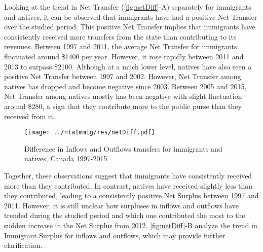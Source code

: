 \vspace{0.7em}\par
Looking at the trend in Net Transfer (\autoref{fig:netDiff}-A) separately for immigrants and natives, it can be observed that immigrants have had a positive Net Transfer over the studied period.
This positive Net Transfer implies that immigrants have consistently received more transfers from the state than contributing to its revenues.
Between 1997 and 2011, the average Net Transfer for immigrants fluctuated around \$\num{1400} per year.
However, it rose rapidly between 2011 and 2013 to surpass \$\num{2100}.
Although at a much lower level, natives have also seen a positive Net Transfer between 1997 and 2002.
However, Net Transfer among natives has dropped and become negative since 2003.
Between 2005 and 2015, Net Transfer among natives mostly has been negative with slight fluctuation around \$280, a sign that they contribute more to the public purse than they received from it.

  \begin{figure}[H]%
    \caption{Difference in Inflows and Outflows transfers for immigrants and natives, Canada 1997-2015}
    \texttt{[image: ../ntaImmig/res/netDiff.pdf]}%
    \label{fig:netDiff}%
  \end{figure}%

\vspace{0.7em}\par
Together, these observations suggest that immigrants have consistently received more than they contributed.
In contrast, natives have received slightly less than they contributed, leading to a consistently positive Net Surplus between 1997 and 2011.
However, it is still unclear how surpluses in inflows and outflows have trended during the studied period and which one contributed the most to the sudden increase in the Net Surplus from 2012.
\autoref{fig:netDiff}-B analyze the trend in Immigrant Surplus for inflows and outflows, which may provide further clarification.

